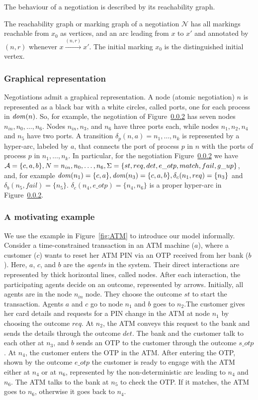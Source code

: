 The behaviour of a negotiation is described by its reachability graph.

\begin{definition}
The \textsf{reachability graph} or \textsf{marking graph} of a negotiation $\mathcal{N}$ has all markings reachable from $x_0$ as vertices, and an arc leading from $x$ to $x'$ and annotated by $(n, r)$ whenever $x \xrightarrow{(n,r)} x'$. The initial marking $x_0$ is the distinguished initial vertex.
\end{definition}

\subsubsection{Graphical representation}
Negotiations admit a graphical representation. A node (atomic negotiation) $n$ is represented as a black bar with a white circles, called ports, one for each process in $\mathit{dom}(n)$. So, for example, the negotiation of Figure~\ref{} has seven nodes $n_{in}, n_0, \dots, n_6$. Nodes $n_{in}, n_3$, and $n_6$ have three ports each, while nodes $n_1, n_2, n_4$ and $n_5$ have two ports. A transition $\delta_p(n,a) = {n_1,\dots,n_k}$ is represented by a hyper-arc, labeled by $a$, that connects the port of process $p$ in $n$ with the ports of process $p$ in $n_1,\dots,n_k$. In particular, for the negotiation Figure~\ref{} we have ${\mathcal A} = \{c, a, b\}, N = n_{in}, n_0, \dots, n_6, \Sigma = \{st, req, det, e\_otp, match, fail, g\_up\}$, and, for example $\mathit{dom}(n_1) = \{c, a\}, \mathit{dom}(n_3) = \{c, a, b\}, \delta_c(n_1,req) = \{n_3\}$ and $\delta_b(n_5, fail) = \{n_5\}$. $\delta_c(n_4, e\_otp) = \{n_4, n_6\}$ is a proper hyper-arc in Figure~\ref{}.

\subsubsection{A motivating example}

We use the example in Figure~\ref{fig:ATM} to introduce our model informally.  Consider a time-constrained transaction in an ATM machine ($a$), where a customer ($c$) wants to reset her ATM PIN via an OTP received from her bank ($b$).  Here, $a$, $c$, and $b$ are the \emph{agents} in the system. Their direct interactions are represented by thick horizontal lines, called nodes. After each interaction, the participating agents decide on an outcome, represented by arrows. Initially, all agents are in the node $n_{in}$ node. They choose the outcome $st$ to start the transaction. Agents $a$ and $c$ go to node $n_1$ and $b$ goes to $n_2$.The customer gives her card details and requests for a PIN change in the ATM at  node $n_1$ by choosing the outcome $req$. At $n_2$, the ATM conveys this request to the bank and sends the details through the outcome $det$. The bank and the customer talk to each other at $n_3$, and $b$ sends an OTP to the customer through the outcome $s\_otp$. At $n_4$, the customer enters the OTP in the ATM. After entering the OTP, shown by the outcome $e\_otp$ the customer is ready to engage with the ATM either at $n_4$ or at $n_6$, represented by the non-deterministic arc leading to $n_4$ and $n_6$. The ATM talks to the bank at $n_5$ to check the OTP. If it matches, the ATM goes to $n_6$, otherwise it goes back to $n_4$.

